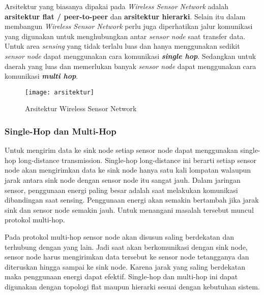 Arsitektur yang biasanya dipakai pada \textit{Wireless Sensor Network} adalah \textbf{arsitektur flat / peer-to-peer} dan \textbf{arsitektur hierarki}. Selain itu dalam membangun \textit{Wireless Sensor Network} perlu juga diperhatikan jalur komunikasi yang digunakan untuk menghubungkan antar \textit{sensor node} saat transfer data. Untuk area \textit{sensing} yang tidak terlalu luas dan hanya menggunakan sedikit \textit{sensor node} dapat menggunakan cara komunikasi \textbf{\textit{single hop}}. Sedangkan untuk daerah yang luas dan memerlukan banyak \textit{sensor node} dapat menggunakan cara komunikasi \textbf{\textit{multi hop}}. 

\begin{figure} [H]
	\centering  
	\texttt{[image: arsitektur]}  
	\caption[Arsitektur Wireless Sensor Network]{Arsitektur Wireless Sensor Network} 
	\label{fig:arsitektur} 
\end{figure} 

\subsubsection{Single-Hop dan Multi-Hop}
Untuk mengirim data ke sink node setiap sensor node dapat menggunakan single-hop long-distance transmission. Single-hop long-distance ini berarti setiap sensor node akan mengirimkan data ke sink node hanya satu kali lompatan walaupun jarak antara sink node dengan sensor node itu sangat jauh. Dalam jaringan sensor, penggunaan energi paling besar adalah saat melakukan komunikasi dibandingan saat sensing. Penggunaan energi akan semakin bertambah jika jarak sink dan sensor node semakin jauh. Untuk menangani masalah tersebut muncul protokol multi-hop.

Pada protokol multi-hop sensor node akan disusun saling berdekatan dan terhubung dengan yang lain. Jadi saat akan berkomunikasi dengan sink node, sensor node harus mengirimkan data tersebut ke sensor node tetangganya dan diteruskan hingga sampai ke sink node. Karena jarak yang saling berdekatan maka penggunaan energi dapat efektif. Single-hop dan multi-hop ini dapat digunakan dengan topologi flat maupun hierarki sesuai dengan kebutuhan sistem.

